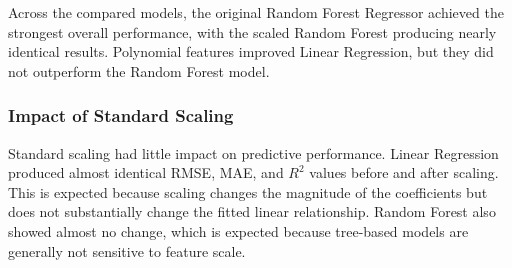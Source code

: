 \documentclass[11pt]{article}
\begin{document}
\begin{table}[ht]
    \centering
    \caption{Question 1 regression model comparison on the held-out test set.}
    \label{tab:q1-regression-comparison}
\end{table}

Across the compared models, the original Random Forest Regressor achieved the strongest overall performance, with the scaled Random Forest producing nearly identical results. Polynomial features improved Linear Regression, but they did not outperform the Random Forest model.

\subsubsection{Impact of Standard Scaling}

Standard scaling had little impact on predictive performance. Linear Regression produced almost identical RMSE, MAE, and $R^2$ values before and after scaling. This is expected because scaling changes the magnitude of the coefficients but does not substantially change the fitted linear relationship. Random Forest also showed almost no change, which is expected because tree-based models are generally not sensitive to feature scale.
\end{document}
